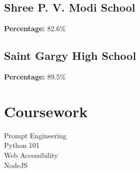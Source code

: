 \documentclass[letterpaper]{deedy-resume} %
\begin{document}
\begin{minipage}[t]{0.33\textwidth}
\sectionspace %




\subsection{Shree P. V. Modi School}
\textbf{Percentage:} 82.6\%

\sectionspace %





\subsection{Saint Gargy High School}
\textbf{Percentage:} 89.5\%
\vspace{-\topsep}






\section{Coursework}
Prompt Engineering \\
Python 101 \\
Web Accessibility \\
NodeJS \\
\sectionspace %



\end{minipage} %
\hfill
%
%
\end{document}
